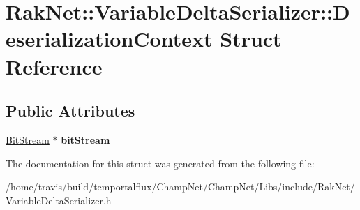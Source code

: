 \hypertarget{struct_rak_net_1_1_variable_delta_serializer_1_1_deserialization_context}{\section{Rak\-Net\-:\-:Variable\-Delta\-Serializer\-:\-:Deserialization\-Context Struct Reference}
\label{struct_rak_net_1_1_variable_delta_serializer_1_1_deserialization_context}
}
\subsection*{Public Attributes}
\begin{DoxyCompactItemize}
\item 
\hypertarget{struct_rak_net_1_1_variable_delta_serializer_1_1_deserialization_context_a34c88a34d4898458fd77c15da0836c14}{\hyperlink{class_rak_net_1_1_bit_stream}{Bit\-Stream} $\ast$ {\bfseries bit\-Stream}}\label{struct_rak_net_1_1_variable_delta_serializer_1_1_deserialization_context_a34c88a34d4898458fd77c15da0836c14}

\end{DoxyCompactItemize}


The documentation for this struct was generated from the following file\-:\begin{DoxyCompactItemize}
\item 
/home/travis/build/temportalflux/\-Champ\-Net/\-Champ\-Net/\-Libs/include/\-Rak\-Net/Variable\-Delta\-Serializer.\-h\end{DoxyCompactItemize}
